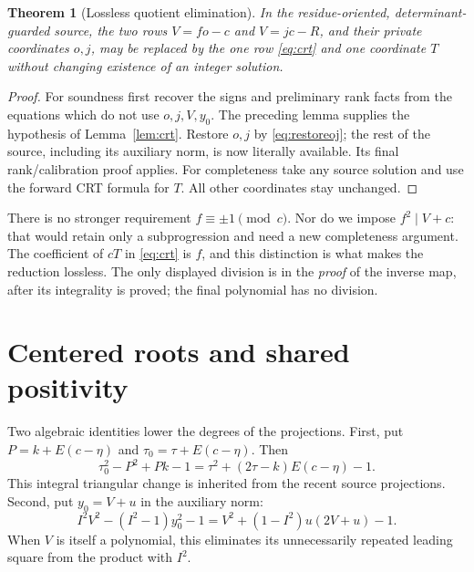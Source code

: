 \documentclass[11pt]{article}
\newtheorem{theorem}{Theorem}[section]
\theoremstyle{remark}\newtheorem{remark}[theorem]{Remark}
\begin{document}
\begin{theorem}[Lossless quotient elimination]
In the residue-oriented, determinant-guarded source, the two rows
$V=fo-c$ and $V=jc-R$, and their private coordinates $o,j$, may be
replaced by the one row \eqref{eq:crt} and one coordinate $T$ without
changing existence of an integer solution.
\end{theorem}
\begin{proof}
For soundness first recover the signs and preliminary rank facts from
the equations which do not use $o,j,V,y_0$. The preceding lemma supplies
the hypothesis of Lemma~\ref{lem:crt}. Restore $o,j$ by
\eqref{eq:restoreoj}; the rest of the source, including its auxiliary
norm, is now literally available. Its final rank/calibration proof
applies. For completeness take any source solution and use the forward
CRT formula for $T$. All other coordinates stay unchanged.
\end{proof}

There is no stronger requirement $f\equiv\pm1\pmod c$. Nor do we
impose $f^2\mid V+c$: that would retain only a subprogression and need a
new completeness argument. The coefficient of $cT$ in
\eqref{eq:crt} is $f$, and this distinction is what makes the reduction
lossless. The only displayed division is in the \emph{proof} of the
inverse map, after its integrality is proved; the final polynomial has
no division.

\section{Centered roots and shared positivity}
\label{sec:centering}

Two algebraic identities lower the degrees of the projections. First,
put $P=k+E(c-\eta)$ and $\tau_0=\tau+E(c-\eta)$. Then
\begin{equation}
 \tau_0^2-P^2+Pk-1
 =\tau^2+(2\tau-k)E(c-\eta)-1.               \label{eq:centerfirst}
\end{equation}
This integral triangular change is inherited from the recent source
projections. Second, put $y_0=V+u$ in the auxiliary norm:
\begin{equation}
 I^2V^2-(I^2-1)y_0^2-1
 =V^2+(1-I^2)u(2V+u)-1.                      \label{eq:centeraux}
\end{equation}
When $V$ is itself a polynomial, this eliminates its unnecessarily
repeated leading square from the product with $I^2$.
\end{document}
